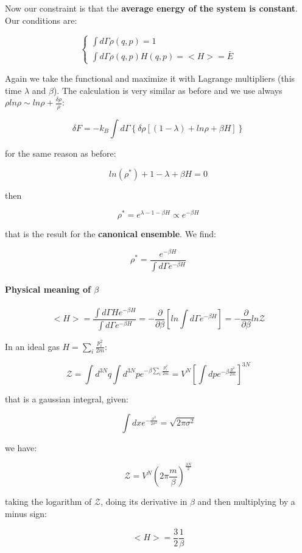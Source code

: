 \documentclass[a4paper, italian, openany]{book}
\begin{document}
Now our constraint is that the \textbf{average energy of the system is constant}. Our conditions are:

$$\begin{cases}
\int d\Gamma \rho(q, p) = 1\\
\int d\Gamma \rho(q, p) H(q, p) = <H> = \bar{E}
\end{cases}
$$

Again we take the functional and maximize it with Lagrange multipliers (this time $\lambda$ and $\beta$). The calculation is very similar as before and we use always $\rho ln \rho \sim ln\rho + \frac{\delta \rho}{\rho}$:

$$\delta F = -k_B \int d\Gamma \left \{ \delta \rho [(1-\lambda) + ln \rho + \beta H] \right \}$$

for the same reason as before:

$$ln(\rho^*) + 1 - \lambda + \beta H = 0$$

then

$$\rho^* = e^{\lambda -1 -\beta H} \propto e^{-\beta H}$$

that is the result for the \textbf{canonical ensemble}. We find:

$$\rho^* = \frac{e^{-\beta H}}{\int d\Gamma e^{-\beta H}}$$

\paragraph{Physical meaning of $\beta$}

$$<H> = \frac{\int d\Gamma H e^{-\beta H}}{\int d\Gamma e^{-\beta H}} = -\frac{\partial}{\partial \beta} \left [ ln \int d\Gamma e^{-\beta H} \right ] = -\frac{\partial}{\partial \beta} ln \mathcal{Z}$$

In an ideal gas $H = \sum_i \frac{p_i^2}{2m}$:

$$\mathcal{Z} = \int d^{3N} q \int d^{3N} p e^{- \beta \sum_i \frac{p_i^2}{2m}} = V^N \left [ \int dp e^{-\beta \frac{p^2}{2m} }\right ]^{3N}$$

that is a gaussian integral, given:

$$\int dx e^{-\frac{x^2}{2\sigma^2}} = \sqrt{2\pi \sigma^2}$$

we have:

$$\mathcal{Z} = V^N \left ( 2\pi \frac{m}{\beta} \right )^{\frac{3N}{2}}$$

taking the logarithm of $\mathcal{Z}$, doing its derivative in $\beta$ and then multiplying by a minus sign:

$$<H> = \frac{3}{2}\frac{1}{\beta}$$
\end{document}
